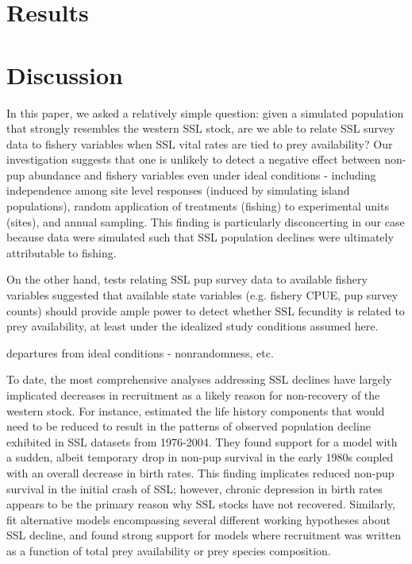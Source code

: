 \documentclass[nonumbib,leqno]{nrc1}
\begin{document}
\section{Results}

\section{Discussion}

In this paper, we asked a relatively simple question: given a simulated population that strongly resembles the western SSL stock, are we able to relate SSL survey data to fishery variables when SSL vital rates are tied to prey availability? Our investigation suggests that one is unlikely to detect a negative effect between non-pup abundance and fishery variables even under ideal conditions - including independence among site level responses (induced by simulating island populations), random application of treatments (fishing) to experimental units (sites), and annual sampling.  This finding is particularly disconcerting in our case because data were simulated such that SSL population declines were ultimately attributable to fishing.

On the other hand, tests relating SSL pup survey data to available fishery variables suggested that available state variables (e.g. fishery CPUE, pup survey counts) should provide ample power to detect whether SSL fecundity is related to prey availability, at least under the idealized study conditions assumed here. 


departures from ideal conditions - nonrandomness, etc.

To date, the most comprehensive analyses addressing SSL declines have largely implicated decreases in recruitment as a likely reason for non-recovery of the western stock.  For instance, \citet{HolmesEtAl2007} estimated the life history components that would need to be reduced to result in
the patterns of observed population decline exhibited in SSL datasets from 1976-2004.  They found support for a model with a sudden, albeit temporary drop in non-pup survival in the early 1980s coupled with an overall decrease in birth rates.  This finding implicates reduced non-pup survival in the initial crash of SSL; however, chronic depression in birth rates appears to be the primary reason why SSL stocks have not recovered.  Similarly, \citet{Wolf:2008qf} fit alternative models encompassing several different working hypotheses about SSL decline, and found strong support for models where recruitment was written as a function of total prey availability or prey species composition.
\end{document}
